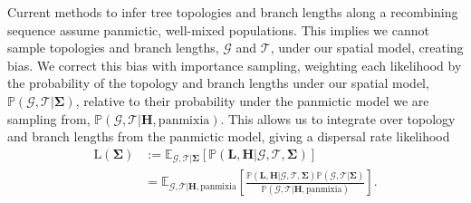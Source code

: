 \documentclass[12pt]{article}
\begin{document}
Current methods to infer tree topologies and branch lengths along a recombining sequence \citep{rasmussen2014genome,speidel2019method,kelleher2019inferring,wohns2021unified} assume panmictic, well-mixed populations. 
This implies we cannot sample topologies and branch lengths, $\mathcal{G}$ and $\mathcal{T}$, under our spatial model, creating  bias.
We correct this bias with importance sampling, weighting each likelihood by the probability of the topology and branch lengths under our spatial model, $\mathbb{P}(\mathcal{G}, \mathcal{T} | \mathbf{\Sigma})$, relative to their probability under the panmictic model we are sampling from, $\mathbb{P}(\mathcal{G}, \mathcal{T} | \mathbf{H}, \mathrm{panmixia})$.
This allows us to integrate over topology and branch lengths from the panmictic model, giving a dispersal rate likelihood
%
\begin{equation}
\begin{aligned}
\mathrm{L}(\mathbf{\Sigma}) &:= \mathbb{E}_{\mathcal{G}, \mathcal{T} | \mathbf{\Sigma}} \left[ \mathbb{P}(\mathbf{L},\mathbf{H} | \mathcal{G},\mathcal{T},\mathbf{\Sigma}) \right] \\
&= \mathbb{E}_{ \mathcal{G}, \mathcal{T} | \mathbf{H}, \mathrm{panmixia}} \left[ \frac{\mathbb{P}(\mathbf{L},\mathbf{H} | \mathcal{G}, \mathcal{T},\mathbf{\Sigma}) \mathbb{P}(\mathcal{G}, \mathcal{T} | \mathbf{\Sigma})}{\mathbb{P}(\mathcal{G}, \mathcal{T} | \mathbf{H}, \mathrm{panmixia})} \right].
\end{aligned}
\end{equation}
\end{document}
